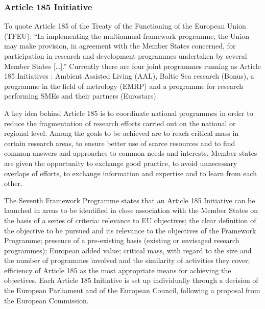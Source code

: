 \documentclass[10pt, plain]{../../metanetpaper}
\begin{document}
\begin{multicols}{2}
%

\subsubsection{Article 185 Initiative}
\label{sec:article-185-init}

To quote Article 185 of the Treaty of the Functioning of the European Union (TFEU): ``In implementing the multiannual framework programme, the Union may make provision, in agreement with the Member States concerned, for participation in research and development programmes undertaken by several Member States [\dots].''  Currently there are four joint programmes running as Article 185 Initiatives \cite{A185}: Ambient Assisted Living (AAL), Baltic Sea research (Bonus), a programme in the field of metrology (EMRP) and a programme for research performing SMEs and their partners (Eurostars).

A key idea behind Article 185 is to coordinate national programmes in order to reduce the fragmentation of research efforts carried out on the national or regional level. Among the goals to be achieved are to reach critical mass in certain research areas, to ensure better use of scarce resources and to find common answers and approaches to common needs and interests. Member states are given the opportunity to exchange good practice, to avoid unnecessary overlaps of efforts, to exchange information and expertise and to learn from each other.

The Seventh Framework Programme states that an Article 185 Initiative can be launched in areas to be identified in close association with the Member States on the basis of a series of criteria: relevance to EU objectives; the clear definition of the objective to be pursued and its relevance to the objectives of the Framework Programme; presence of a pre-existing basis (existing or envisaged research programmes); European added value; critical mass, with regard to the size and the number of programmes involved and the similarity of activities they cover; efficiency of Article 185 as the most appropriate means for achieving the objectives. Each Article 185 Initiative is set up individually through a decision of the European Parliament and of the European Council, following a proposal from the European Commission.


\end{multicols}
\end{document}
